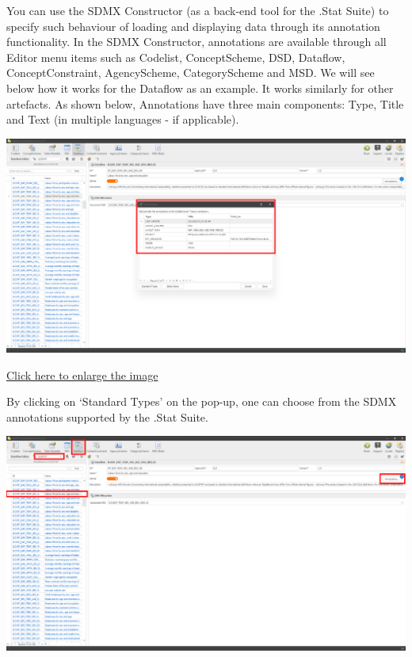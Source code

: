 \documentclass[
]{book}
\begin{document}
You can use the SDMX Constructor (as a back-end tool for the .Stat Suite) to specify such behaviour of loading and displaying data through its annotation functionality. In the SDMX Constructor, annotations are available through all Editor menu items such as Codelist, ConceptScheme, DSD, Dataflow, ConceptConstraint, AgencyScheme, CategoryScheme and MSD. We will see below how it works for the Dataflow as an example. It works similarly for other artefacts. As shown below, Annotations have three main components: Type, Title and Text (in multiple languages - if applicable).

\begin{center}\includegraphics[width=1\linewidth]{./images/image1} \end{center}

\href{images/image1.png}{Click here to enlarge the image}

By clicking on `Standard Types' on the pop-up, one can choose from the SDMX annotations supported by the .Stat Suite.

\begin{center}\includegraphics[width=1\linewidth]{./images/image2} \end{center}
\end{document}
